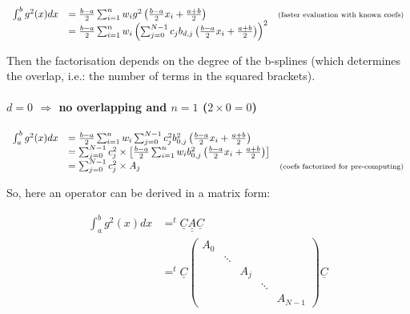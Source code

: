 \documentclass[paper=a4, fontsize=11pt]{scrartcl}
\numberwithin{equation}{section}		%
\numberwithin{figure}{section}			%
\numberwithin{table}{section}				%
\begin{document}
$$
\begin{array}{lll}
\int_a^b g^2(x)dx & = \frac{b-a}{2}\sum_{i=1}^n w_i g^2\left(\frac{b-a}{2}x_i + \frac{a+b}{2}\right) & \text{\scriptsize (faster evaluation with known coefs)}\\
& = \frac{b-a}{2}\sum_{i=1}^n w_i \left(\sum_{j=0}^{N-1} c_jb_{d,j}\left(\frac{b-a}{2}x_i + \frac{a+b}{2}\right)\right)^2 & \\
\end{array}
$$

Then the factorisation depends on the degree of the b-splines (which determines the overlap, i.e.: the number of terms in the squared brackets).

\paragraph{\textbf{$d=0$ $\Rightarrow$ no overlapping and $n=1$ ($2\times0=0$)}}
$$
\begin{array}{lll}
\int_a^b g^2(x)dx & = \frac{b-a}{2}\sum_{i=1}^n w_i \sum_{j=0}^{N-1} c_j^2b_{0,j}^2\left(\frac{b-a}{2}x_i + \frac{a+b}{2}\right) & \\
& = \sum_{j=0}^{N-1} c_j^2 \times \left[\frac{b-a}{2}\sum_{i=1}^n w_i b_{0,j}^2\left(\frac{b-a}{2}x_i + \frac{a+b}{2}\right) \right] & \\
& = \sum_{j=0}^{N-1} c_j^2 \times A_j & \text{\scriptsize (coefs factorized for pre-computing)}
\end{array}
$$

So, here an operator can be derived in a matrix form:

$$
\begin{array}{ll}
\int_a^b g^2(x)dx & = ^t\underline{C}\underline{\underline{A}}\underline{C}\\
& = ^t\underline{C} \left(\begin{array}{ccccc}A_0 &&&&\\ &\ddots&&&\\&&A_j&&\\&&&\ddots&\\&&&&A_{N-1} \end{array}\right) \underline{C}
\end{array}
$$
\end{document}
